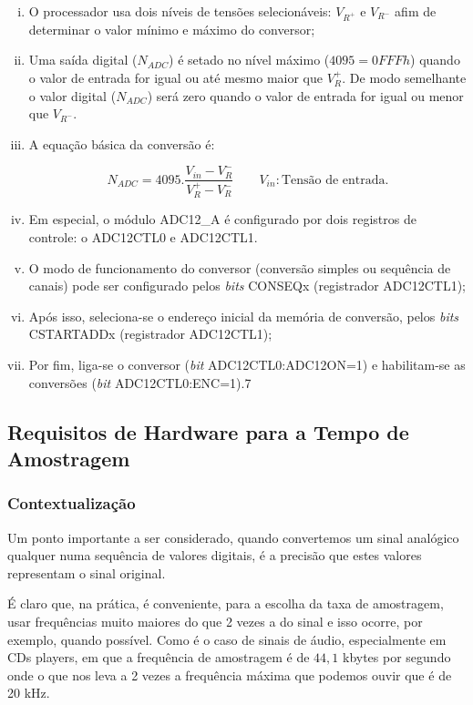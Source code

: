 			\begin{enumerate}[(i)]
				\item O processador usa dois níveis de tensões selecionáveis: $V_{R^{+}} $ e $ V_{R^{-}} $ afim de determinar o valor mínimo e máximo do conversor;
				\item Uma saída digital ($ N_{ADC} $) é setado no nível máximo ($ 4095 = 0FFFh $) quando o valor de entrada for igual ou até mesmo maior que $ V_R^+ $. De modo semelhante o valor digital ($ N_{ADC} $) será zero quando o valor de entrada for igual ou menor que $ V_{R^-} $.
				\item A equação básica da conversão é:
				
				\begin{equation}
					\label{eq-adc12-formula}
					N_{ADC} = 4095.\frac{V_{in}-V_R^-}{V_R^+ - V_R^-}
					\qquad
					V_{in}: \text{Tensão de entrada}.
				\end{equation}
				\item Em especial, o módulo ADC12\_A é configurado por dois registros de controle: o ADC12CTL0 e ADC12CTL1.
				\item  O modo de funcionamento do conversor (conversão simples ou sequência de canais) pode ser configurado pelos \textit{bits} CONSEQx (registrador ADC12CTL1);
				\item Após isso, seleciona-se o endereço inicial da memória de conversão, pelos \textit{bits} CSTARTADDx (registrador ADC12CTL1);
				\item Por fim, liga-se o conversor (\textit{bit} ADC12CTL0:ADC12ON=1) e habilitam-se as conversões (\textit{bit} ADC12CTL0:ENC=1).7
			\end{enumerate}
	
	\subsection{Requisitos de Hardware para a Tempo de Amostragem}
		
		\subsubsection{Contextualização}
		
		Um ponto importante a ser considerado, quando convertemos um sinal analógico qualquer numa sequência de valores digitais, é a precisão que estes valores representam o sinal original. 
		
		É claro que, na prática, é conveniente, para a escolha da taxa de amostragem, usar frequências muito maiores do que 2 vezes a do sinal e isso ocorre, por exemplo, quando possível.  Como é o caso  de sinais de áudio, especialmente em  CDs players,  em  que  a frequência de amostragem é de $44,1$ kbytes por segundo onde o que nos leva a 2 vezes a frequência máxima que podemos ouvir que é de 20 kHz.
		
